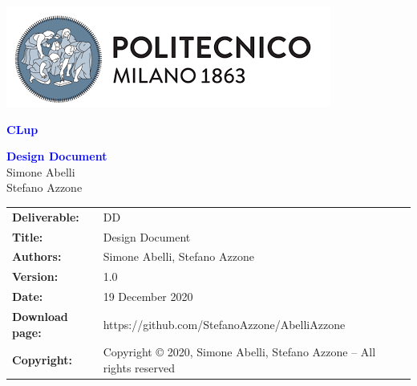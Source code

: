 
\usepackage[utf8]{inputenc}
\usepackage[dvipsnames]{xcolor}
\usepackage{listings}
\usepackage{alloy-style}



\begin{titlepage}



\centering
\includegraphics[scale=0.5]{Images/PolimiLogo}

\vspace{4cm}

{\textcolor{Blue}{\textbf{\Huge{CLup}}}} \\ [1cm]


\vspace{4cm}

{\textcolor{Blue}{\textbf{\Huge{Design Document}}}} \\ [1cm]

\vspace{4cm}
Simone Abelli \\
Stefano Azzone

\end{titlepage}

\begin{table}[h!]
\begin{tabu} to \textwidth { X[0.3,r,p] X[0.7,l,p] }
\hline

\textbf{Deliverable:} & DD\\
\textbf{Title:} & Design Document \\
\textbf{Authors:} & Simone Abelli, Stefano Azzone \\
\textbf{Version:} & 1.0 \\ 
\textbf{Date:} & 19 December 2020 \\
\textbf{Download page:} & https://github.com/StefanoAzzone/AbelliAzzone \\
\textbf{Copyright:} & Copyright © 2020, Simone Abelli, Stefano Azzone – All rights reserved \\
\hline
\end{tabu}
\end{table}




